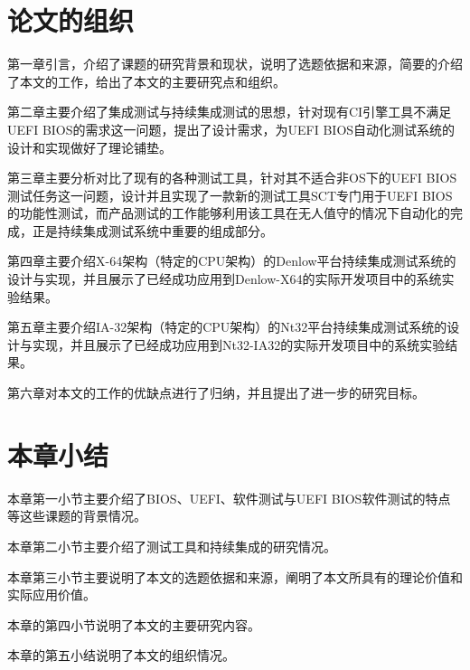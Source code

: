 \section{论文的组织}
	
	第一章引言，介绍了课题的研究背景和现状，说明了选题依据和来源，简要的介绍了本文的工作，给出了本文的主要研究点和组织。
	
	第二章主要介绍了集成测试与持续集成测试的思想，针对现有CI引擎工具不满足UEFI BIOS的需求这一问题，提出了设计需求，为UEFI BIOS自动化测试系统的设计和实现做好了理论铺垫。
	
	第三章主要分析对比了现有的各种测试工具，针对其不适合非OS下的UEFI BIOS测试任务这一问题，设计并且实现了一款新的测试工具SCT专门用于UEFI BIOS的功能性测试，而产品测试的工作能够利用该工具在无人值守的情况下自动化的完成，正是持续集成测试系统中重要的组成部分。
	
	第四章主要介绍X-64架构（特定的CPU架构）的Denlow平台持续集成测试系统的设计与实现，并且展示了已经成功应用到Denlow-X64的实际开发项目中的系统实验结果。
	
	第五章主要介绍IA-32架构（特定的CPU架构）的Nt32平台持续集成测试系统的设计与实现，并且展示了已经成功应用到Nt32-IA32的实际开发项目中的系统实验结果。
	
	第六章对本文的工作的优缺点进行了归纳，并且提出了进一步的研究目标。
	
\section{本章小结}
  
    本章第一小节主要介绍了BIOS、UEFI、软件测试与UEFI BIOS软件测试的特点等这些课题的背景情况。
	
	本章第二小节主要介绍了测试工具和持续集成的研究情况。
	
	本章第三小节主要说明了本文的选题依据和来源，阐明了本文所具有的理论价值和实际应用价值。
	
	本章的第四小节说明了本文的主要研究内容。
	
	本章的第五小结说明了本文的组织情况。

	